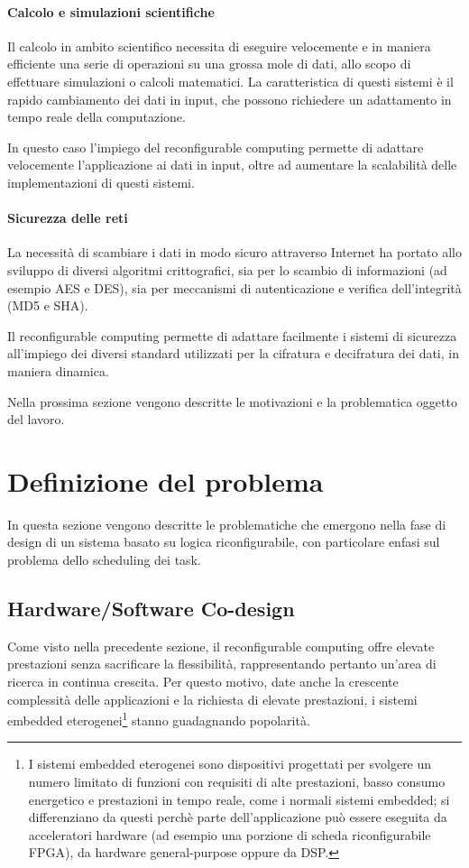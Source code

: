 \paragraph{Calcolo e simulazioni scientifiche}
Il calcolo in ambito scientifico necessita di eseguire velocemente e in maniera efficiente
una serie di operazioni su una grossa mole di dati, allo scopo di effettuare simulazioni o
calcoli matematici. La caratteristica di questi sistemi è il rapido cambiamento dei dati in
input, che possono richiedere un adattamento in tempo reale della computazione.

In questo caso l'impiego del reconfigurable computing permette di adattare velocemente
l'applicazione ai dati in input, oltre ad aumentare la scalabilità delle implementazioni
di questi sistemi.


\paragraph{Sicurezza delle reti}
La necessità di scambiare i dati in modo sicuro attraverso Internet ha portato allo sviluppo
di diversi algoritmi crittografici, sia per lo scambio di informazioni (ad esempio
\ac{AES} e \ac{DES}), sia per meccanismi di autenticazione e verifica dell'integrità
(MD5 e \ac{SHA}).

Il reconfigurable computing permette di adattare facilmente i sistemi di sicurezza
all'impiego dei diversi standard utilizzati per la cifratura e decifratura dei dati, in
maniera dinamica.

Nella prossima sezione vengono descritte le motivazioni e la problematica oggetto del
lavoro.

\section{Definizione del problema}
\label{sec:definizioneProblema}
In questa sezione vengono descritte le problematiche che emergono nella fase di de\-sign
di un sistema basato su logica riconfigurabile, con particolare enfasi sul problema dello
scheduling dei task.

\subsection{Hardware/Software Co-design}
Come visto nella precedente sezione, il reconfigurable computing offre elevate
prestazioni senza sacrificare la flessibilità, rappresentando pertanto un'area di
ricerca in continua crescita. Per questo motivo, date anche la crescente complessità
delle applicazioni e la richiesta di elevate prestazioni, i sistemi embedded
eterogenei\footnote{I sistemi embedded eterogenei sono dispositivi progettati per
svolgere un numero limitato di funzioni con requisiti di alte prestazioni, basso consumo
energetico e prestazioni in tempo reale, come i normali sistemi embedded; si
differenziano da questi perchè parte dell'applicazione può essere eseguita da
acceleratori hardware (ad esempio una porzione di scheda riconfigurabile FPGA), da
hardware general-purpose oppure da \ac{DSP}.} stanno guadagnando popolarità.

